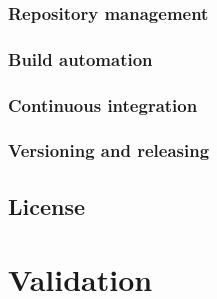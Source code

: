 \documentclass[12pt,a4paper,openright,twoside]{book}
\begin{document}
\subsection*{Repository management}
\subsection*{Build automation}
\subsection*{Continuous integration}
\subsection*{Versioning and releasing}

\section{License}

\chapter{Validation} %
\label{chap:validation}


\chapter{\conclusionsname}
\label{chap:conclusions}





\end{document}
